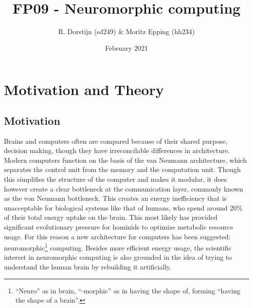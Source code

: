 \documentclass[a4paper,twocolumn]{article}
\title{FP09 - Neuromorphic computing}
\author{R. Dorstijn (sd249) \& Moritz Epping (hh234)}
\date{February 2021}
\begin{document}
\maketitle

\section{Motivation and Theory}
\subsection{Motivation}
Brains and computers often are compared because of their shared purpose,
decision making, though they have irreconcilable differences in architecture.
Modern computers function on the basis of the van Neumann
architecture\cite{von-Neumann}, which separates the control unit from the memory
and the computation unit. Though this simplifies the structure of the computer and
makes it modular, it does however create a clear bottleneck at the communication layer,
commonly known as the von Neumann bottleneck. This creates an energy
inefficiency that is unacceptable for biological systems like that of
humans, who spend around 20\% of their total energy uptake on the brain\cite{metabolic-rates}.
This most likely has provided significant evolutionary pressure for hominids to
optimize metabolic resource usage\cite{seymour2016fossil}.  For this reason a new
architecture for computers has been suggested: neuromorphic\footnote{``Neuro''
as in brain, ``-morphic'' as in having the shape of, forming ``having the shape
of a brain''.} computing.  Besides more efficient energy usage,  the scientific 
interest in neuromorphic computing is also grounded in the idea of trying to 
understand the human brain by rebuilding it artificially.
\end{document}
